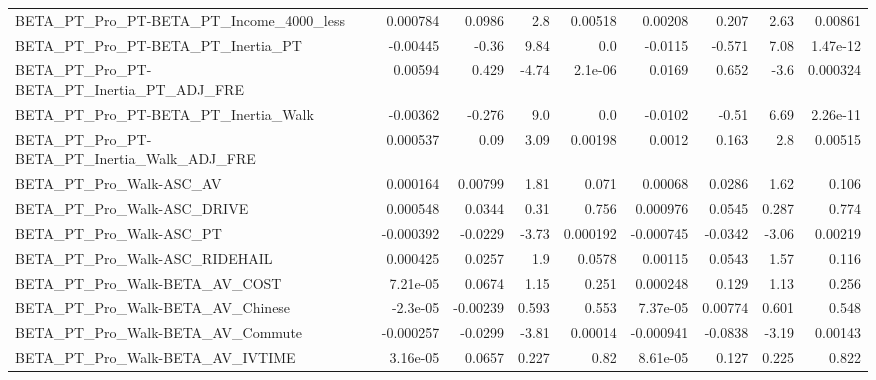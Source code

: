 \begin{tabular}{lrrrrrrrr}
BETA\_PT\_Pro\_PT-BETA\_PT\_Income\_4000\_less            &    0.000784 &       0.0986 &      2.8 &  0.00518 &    0.00208 &       0.207 &         2.63 &       0.00861 \\
BETA\_PT\_Pro\_PT-BETA\_PT\_Inertia\_PT                  &    -0.00445 &        -0.36 &     9.84 &      0.0 &    -0.0115 &      -0.571 &         7.08 &      1.47e-12 \\
BETA\_PT\_Pro\_PT-BETA\_PT\_Inertia\_PT\_ADJ\_FRE          &     0.00594 &        0.429 &    -4.74 &  2.1e-06 &     0.0169 &       0.652 &         -3.6 &      0.000324 \\
BETA\_PT\_Pro\_PT-BETA\_PT\_Inertia\_Walk                &    -0.00362 &       -0.276 &      9.0 &      0.0 &    -0.0102 &       -0.51 &         6.69 &      2.26e-11 \\
BETA\_PT\_Pro\_PT-BETA\_PT\_Inertia\_Walk\_ADJ\_FRE        &    0.000537 &         0.09 &     3.09 &  0.00198 &     0.0012 &       0.163 &          2.8 &       0.00515 \\
BETA\_PT\_Pro\_Walk-ASC\_AV                            &    0.000164 &      0.00799 &     1.81 &    0.071 &    0.00068 &      0.0286 &         1.62 &         0.106 \\
BETA\_PT\_Pro\_Walk-ASC\_DRIVE                         &    0.000548 &       0.0344 &     0.31 &    0.756 &   0.000976 &      0.0545 &        0.287 &         0.774 \\
BETA\_PT\_Pro\_Walk-ASC\_PT                            &   -0.000392 &      -0.0229 &    -3.73 & 0.000192 &  -0.000745 &     -0.0342 &        -3.06 &       0.00219 \\
BETA\_PT\_Pro\_Walk-ASC\_RIDEHAIL                      &    0.000425 &       0.0257 &      1.9 &   0.0578 &    0.00115 &      0.0543 &         1.57 &         0.116 \\
BETA\_PT\_Pro\_Walk-BETA\_AV\_COST                      &    7.21e-05 &       0.0674 &     1.15 &    0.251 &   0.000248 &       0.129 &         1.13 &         0.256 \\
BETA\_PT\_Pro\_Walk-BETA\_AV\_Chinese                   &    -2.3e-05 &     -0.00239 &    0.593 &    0.553 &   7.37e-05 &     0.00774 &        0.601 &         0.548 \\
BETA\_PT\_Pro\_Walk-BETA\_AV\_Commute                   &   -0.000257 &      -0.0299 &    -3.81 &  0.00014 &  -0.000941 &     -0.0838 &        -3.19 &       0.00143 \\
BETA\_PT\_Pro\_Walk-BETA\_AV\_IVTIME                    &    3.16e-05 &       0.0657 &    0.227 &     0.82 &   8.61e-05 &       0.127 &        0.225 &         0.822 \\

\end{tabular}
